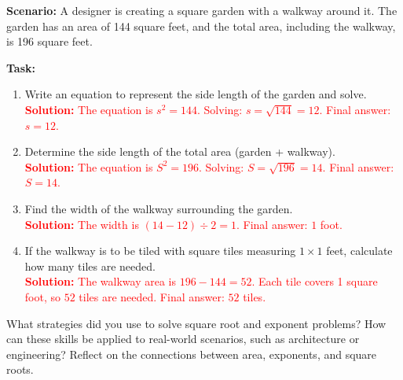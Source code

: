 \documentclass[10pt]{article}
\begin{document}
\begin{tcolorbox}[colframe=black!60, colback=white, 
coltitle=black, colbacktitle=black!15, fonttitle=\bfseries\Large, 
title=Performance Task: Designing a Garden, halign title=center, left=10pt, right=10pt, top=10pt, bottom=100pt]
\textbf{Scenario:} A designer is creating a square garden with a walkway around it. The garden has an area of 144 square feet, and the total area, including the walkway, is 196 square feet.

\textbf{Task:}
\begin{enumerate}[itemsep=4.5em]
    \item Write an equation to represent the side length of the garden and solve.\\
    \textcolor{red}{\textbf{Solution:} The equation is \(s^2 = 144\). Solving: \(s = \sqrt{144} = 12\). Final answer: \(s = 12\).}

    \item Determine the side length of the total area (garden + walkway).\\
    \textcolor{red}{\textbf{Solution:} The equation is \(S^2 = 196\). Solving: \(S = \sqrt{196} = 14\). Final answer: \(S = 14\).}

    \item Find the width of the walkway surrounding the garden.\\
    \textcolor{red}{\textbf{Solution:} The width is \((14 - 12) \div 2 = 1\). Final answer: \(1\) foot.}

    \item If the walkway is to be tiled with square tiles measuring \(1 \times 1\) feet, calculate how many tiles are needed.\\
    \textcolor{red}{\textbf{Solution:} The walkway area is \(196 - 144 = 52\). Each tile covers 1 square foot, so \(52\) tiles are needed. Final answer: \(52\) tiles.}
\end{enumerate}
\end{tcolorbox}

\vspace{1em}

\begin{tcolorbox}[colframe=black!60, colback=white, 
coltitle=black, colbacktitle=black!15, fonttitle=\bfseries\Large, 
title=Reflection, halign title=center, left=10pt, right=10pt, top=10pt, bottom=100pt]
What strategies did you use to solve square root and exponent problems? How can these skills be applied to real-world scenarios, such as architecture or engineering? Reflect on the connections between area, exponents, and square roots.
\end{tcolorbox}
\end{document}
